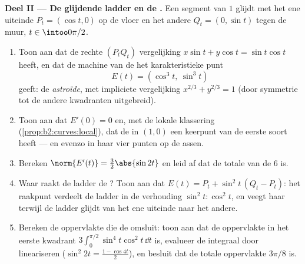 \begin{problem}
\medskip
\noindent\textbf{Deel II --- De glijdende ladder en de .}
Een segment van  $1$ glijdt met het ene uiteinde $P_t =
(\cos t, 0)$ op de vloer en het andere $Q_t = (0, \sin t)$ tegen de
muur, $t \in \intoo0{\pi/2}$.
\begin{enumerate}[resume]
  \item Toon aan dat de rechte $(P_tQ_t)$ vergelijking $x\sin t +
        y\cos t = \sin t\cos t$ heeft, en dat de machine van de
         het karakteristieke punt
        \[
        E(t) = (\cos^3 t,\ \sin^3 t)
        \]
        geeft: de \emph{astroïde}, met impliciete
        vergelijking $x^{2/3} + y^{2/3} = 1$ (door symmetrie tot de
        andere kwadranten uitgebreid).
  \item Toon aan dat $E'(0) = 0$ en, met de lokale klassering
        (\cref{prop:b2:curves:local}), dat de  in $(1, 0)$
        een keerpunt van de eerste soort heeft --- en evenzo in
        haar vier punten op de assen.
  \item Bereken $\norm{E'(t)} = \tfrac32\abs{\sin 2t}$ en leid af
        dat de totale  van de  $6$ is.
  \item Waar raakt de ladder de ? Toon aan dat $E(t) = P_t
        + \sin^2 t\,(Q_t - P_t)$: het raakpunt verdeelt de ladder
        in de verhouding $\sin^2 t : \cos^2 t$, en veegt haar
        terwijl de ladder glijdt van het ene uiteinde naar het
        andere.
  \item Bereken de oppervlakte die de  omsluit: toon aan
        dat de oppervlakte in het eerste kwadrant
        $3\int_0^{\pi/2}\sin^4 t\cos^2 t\,\dd t$ is, evalueer de
        integraal door lineariseren ($\sin^2 2t = \tfrac{1 - \cos
        4t}2$), en besluit dat de totale oppervlakte $3\pi/8$ is.
\end{enumerate}


\end{problem}
